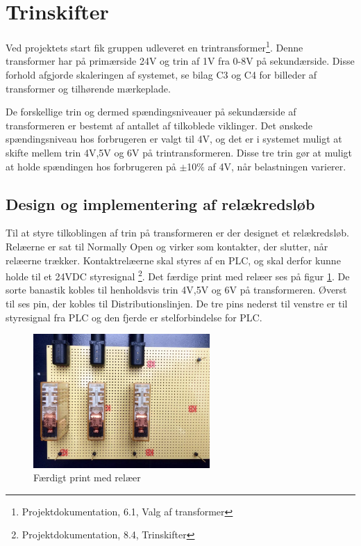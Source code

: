 
\section{Trinskifter}
\label{sec:relae}
Ved projektets start fik gruppen udleveret en trintransformer\footnote{Projektdokumentation, 6.1, Valg af transformer}. Denne transformer har på primærside 24V og trin af 1V fra 0-8V på sekundærside. Disse forhold afgjorde skaleringen af systemet, se bilag C3 og C4 for billeder af transformer og tilhørende mærkeplade. 

De forskellige trin og dermed spændingsniveauer på sekundærside af transformeren er bestemt af antallet af tilkoblede viklinger. Det ønskede spændingsniveau hos forbrugeren er valgt til 4V, og det er i systemet muligt at skifte mellem trin 4V,5V og 6V på trintransformeren. Disse tre trin gør at muligt at holde spændingen hos forbrugeren på $\pm$10$\%$ af 4V, når belastningen varierer.

\subsection{Design og implementering af relækredsløb}
Til at styre tilkoblingen af trin på transformeren er der designet et relækredsløb. Relæerne er sat til Normally Open og virker som kontakter, der slutter, når relæerne trækker. Kontaktrelæerne skal styres af en PLC, og skal derfor kunne holde til et 24VDC styresignal \footnote{Projektdokumentation, 8.4, Trinskifter}. Det færdige print med relæer ses på figur \ref{fig:Relae}. De sorte banastik kobles til henholdsvis trin 4V,5V og 6V på transformeren. Øverst til ses pin, der kobles til Distributionslinjen. De tre pins nederst til venstre er til styresignal fra PLC og den fjerde er stelforbindelse for PLC. 

\begin{figure}[H]
	\centering
	\includegraphics[width=0.6\textwidth]{figure/Relaekredsl}
	\caption{Færdigt print med relæer}
	\label{fig:Relae}
\end{figure}

